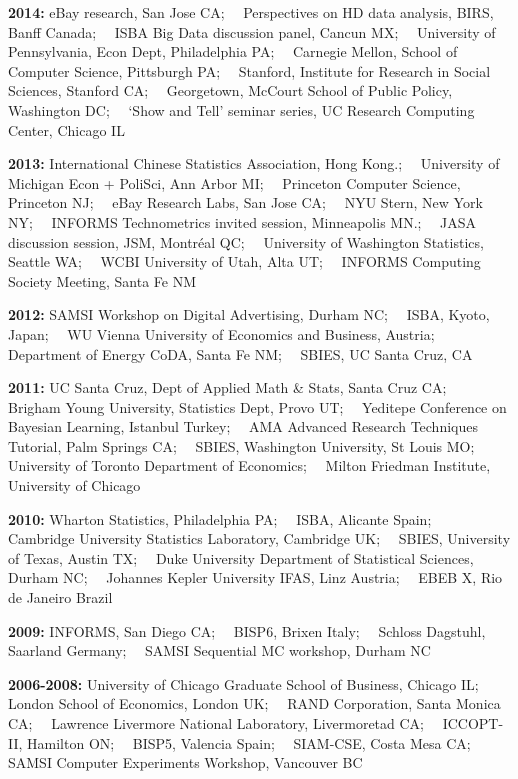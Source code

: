 \documentclass[margin,line]{res}
\begin{document}
\begin{resume}
{\bf 2014:} eBay research, San Jose CA;~~ Perspectives on HD data analysis, BIRS, Banff Canada;~~ ISBA Big Data discussion panel, Cancun MX;~~ University of Pennsylvania, Econ Dept, Philadelphia PA;~~ Carnegie Mellon, School of Computer Science, Pittsburgh PA;~~ Stanford, Institute for Research in Social Sciences, Stanford CA;~~ Georgetown, McCourt School of Public Policy, Washington DC;~~ `Show and Tell' seminar series, UC Research Computing Center, Chicago IL

{\bf 2013:} International Chinese Statistics Association, Hong Kong.;~~ University of Michigan Econ + PoliSci, Ann Arbor MI;~~ Princeton Computer Science, Princeton NJ;~~ eBay Research Labs, San Jose CA;~~ NYU Stern, New York NY;~~ INFORMS Technometrics invited session, Minneapolis MN.;~~ JASA discussion session, JSM, Montr\'eal QC;~~ University of Washington Statistics, Seattle WA;~~ WCBI University of Utah, Alta UT;~~ INFORMS Computing Society Meeting, Santa Fe NM


{\bf 2012:} SAMSI Workshop on Digital Advertising, Durham NC;~~ ISBA, Kyoto, Japan;~~ WU Vienna University of Economics and Business, Austria;~~ Department of Energy CoDA, Santa Fe NM;~~ SBIES, UC Santa Cruz, CA




{\bf 2011:} UC Santa Cruz, Dept of Applied Math \& Stats, Santa Cruz CA;~~ Brigham Young University, Statistics Dept, Provo UT;~~ Yeditepe Conference on Bayesian Learning, Istanbul Turkey;~~ AMA Advanced Research Techniques Tutorial,  Palm Springs CA;~~ SBIES, Washington University, St Louis MO;~~ University of Toronto Department of Economics;~~ Milton Friedman Institute, University of Chicago


{\bf 2010:} Wharton Statistics, Philadelphia PA;~~ ISBA, Alicante Spain;~~ Cambridge University Statistics Laboratory, Cambridge UK;~~ SBIES, University of Texas, Austin TX;~~ Duke University Department of Statistical Sciences, Durham NC;~~ Johannes Kepler University IFAS, Linz Austria;~~ EBEB X, Rio de Janeiro Brazil

{\bf 2009:} INFORMS, San Diego CA;~~ BISP6, Brixen Italy;~~ Schloss Dagstuhl, Saarland Germany;~~ SAMSI Sequential MC workshop, Durham NC


{\bf 2006-2008:} University of Chicago Graduate School of Business, Chicago IL;~~ London School of Economics, London UK;~~ RAND Corporation, Santa Monica CA;~~ Lawrence Livermore National Laboratory, Livermoretad CA;~~ ICCOPT-II, Hamilton ON;~~ BISP5, Valencia Spain;~~ SIAM-CSE, Costa Mesa CA;~~ SAMSI Computer Experiments Workshop, Vancouver BC




\end{resume}
\end{document}
